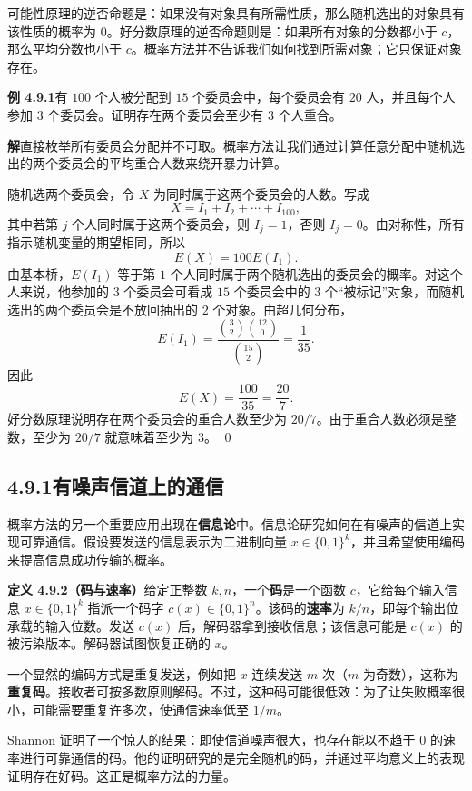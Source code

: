 \documentclass[UTF8, 12pt, fontset=fandol, oneside]{ctexart}
\begin{document}
可能性原理的逆否命题是：如果没有对象具有所需性质，那么随机选出的对象具有该性质的概率为 $0$。好分数原理的逆否命题则是：如果所有对象的分数都小于 $c$，那么平均分数也小于 $c$。概率方法并不告诉我们如何找到所需对象；它只保证对象存在。

\noindent\textbf{例 4.9.1}\quad 有 $100$ 个人被分配到 $15$ 个委员会中，每个委员会有 $20$ 人，并且每个人参加 $3$ 个委员会。证明存在两个委员会至少有 $3$ 个人重合。

\noindent\textbf{解}\quad 直接枚举所有委员会分配并不可取。概率方法让我们通过计算任意分配中随机选出的两个委员会的平均重合人数来绕开暴力计算。

随机选两个委员会，令 $X$ 为同时属于这两个委员会的人数。写成
\[
  X=I_1+I_2+\cdots+I_{100},
\]
其中若第 $j$ 个人同时属于这两个委员会，则 $I_j=1$，否则 $I_j=0$。由对称性，所有指示随机变量的期望相同，所以
\[
  E(X)=100E(I_1).
\]
由基本桥，$E(I_1)$ 等于第 $1$ 个人同时属于两个随机选出的委员会的概率。对这个人来说，他参加的 $3$ 个委员会可看成 $15$ 个委员会中的 $3$ 个“被标记”对象，而随机选出的两个委员会是不放回抽出的 $2$ 个对象。由超几何分布，
\[
  E(I_1)=\frac{\binom{3}{2}\binom{12}{0}}{\binom{15}{2}}=\frac{1}{35}.
\]
因此
\[
  E(X)=\frac{100}{35}=\frac{20}{7}.
\]
好分数原理说明存在两个委员会的重合人数至少为 $20/7$。由于重合人数必须是整数，至少为 $20/7$ 就意味着至少为 $3$。 \qed

\subsection*{4.9.1\quad 有噪声信道上的通信}

概率方法的另一个重要应用出现在\textbf{信息论}中。信息论研究如何在有噪声的信道上实现可靠通信。假设要发送的信息表示为二进制向量 $x\in\{0,1\}^k$，并且希望使用编码来提高信息成功传输的概率。

\noindent\textbf{定义 4.9.2（码与速率）}\quad 给定正整数 $k,n$，一个\textbf{码}是一个函数 $c$，它给每个输入信息 $x\in\{0,1\}^k$ 指派一个码字 $c(x)\in\{0,1\}^n$。该码的\textbf{速率}为 $k/n$，即每个输出位承载的输入位数。发送 $c(x)$ 后，解码器拿到接收信息；该信息可能是 $c(x)$ 的被污染版本。解码器试图恢复正确的 $x$。

一个显然的编码方式是重复发送，例如把 $x$ 连续发送 $m$ 次（$m$ 为奇数），这称为\textbf{重复码}。接收者可按多数原则解码。不过，这种码可能很低效：为了让失败概率很小，可能需要重复许多次，使通信速率低至 $1/m$。

Shannon 证明了一个惊人的结果：即使信道噪声很大，也存在能以不趋于 $0$ 的速率进行可靠通信的码。他的证明研究的是完全随机的码，并通过平均意义上的表现证明存在好码。这正是概率方法的力量。
\end{document}
